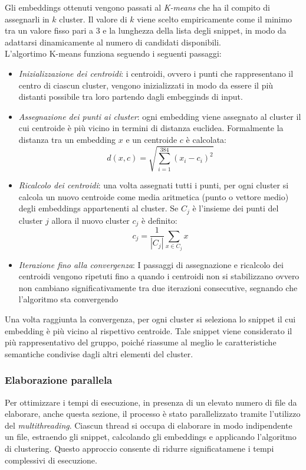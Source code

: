 \documentclass{article}
\begin{document}
Gli embeddings ottenuti vengono passati al \textit{K-means} che ha il compito di assegnarli in $k$ cluster. Il valore di $k$ viene scelto empiricamente come il minimo tra un valore fisso pari a 3 e la lunghezza della lista degli snippet, in modo da adattarsi dinamicamente al numero di candidati disponibili.\\
L'algortimo K-means funziona seguendo i seguenti passaggi:
\begin{itemize}
    \item \textit{Inizializzazione dei centroidi}: i centroidi, ovvero i punti che rappresentano il centro di ciascun cluster, vengono inizializzati in modo da essere il più distanti possibile tra loro partendo dagli embegginds di input.
    \item \textit{Assegnazione dei punti ai cluster}: ogni embedding viene assegnato al cluster il cui centroide è più vicino in termini di distanza euclidea. Formalmente la distanza tra un embedding $x$ e un centroide $c$ è calcolata:
    \begin{equation}
        d(x, c) = \sqrt{\sum_{i=1}^{384} (x_i - c_i)^2}
    \end{equation}
    \item \textit{Ricalcolo dei centroidi}: una volta assegnati tutti i punti, per ogni cluster si calcola un nuovo centroide come media aritmetica (punto o vettore medio) degli embeddings appartenenti al cluster. Se $C_{j}$ è l'insieme dei punti del cluster $j$ allora il nuovo cluster $c_{j}$ è definito:
    \begin{equation}
        c_j = \frac{1}{|C_j|} \sum_{x \in C_j} x
    \end{equation}
    \item \textit{Iterazione fino alla convergenza}: I passaggi di assegnazione e ricalcolo dei centroidi vengono ripetuti fino a quando i centroidi non si stabilizzano ovvero non cambiano significativamente tra due iterazioni consecutive, segnando che l'algoritmo sta convergendo
\end{itemize}
Una volta raggiunta la convergenza, per ogni cluster si seleziona lo snippet il cui embedding è più vicino al rispettivo centroide. Tale snippet viene considerato il più rappresentativo del gruppo, poiché riassume al meglio le caratteristiche semantiche condivise dagli altri elementi del cluster.\\

\subsubsection{Elaborazione parallela}
Per ottimizzare i tempi di esecuzione, in presenza di un elevato numero di file da elaborare, anche questa sezione, il processo è stato parallelizzato tramite l’utilizzo del \textit{multithreading}. Ciascun thread si occupa di elaborare in modo indipendente un file, estraendo gli snippet, calcolando gli embeddings e applicando l’algoritmo di clustering. Questo approccio consente di ridurre significatamene i tempi complessivi di esecuzione.
\end{document}
